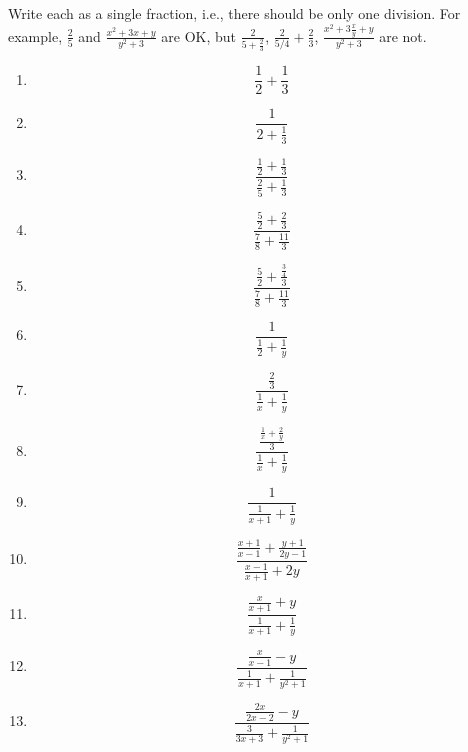 \documentclass[twocolumn,12pt]{report}
\begin{document}
Write each as a single fraction, i.e., there should be only one division.
For example, $\frac{2}{5}$ and $\frac{x^2 + 3x + y}{y^2 + 3}$ are OK, but
$\frac{2}{5 + \frac{2}{3}}$,
$\frac{2}{5/4} + \frac{2}{3}$,
$\frac{x^2 + 3\frac{x}{y} + y}{y^2 + 3}$
are not.


\begin{enumerate}
\item
\[ \frac{1}{2} + \frac{1}{3} \]
\item
\[ \frac{1}{{2} + \frac{1}{3}} \]
\item
\[ \frac{\frac{1}{2} + \frac{1}{3}}{\frac{2}{5} + \frac{1}{3}} \]
\item
\[ \frac{\frac{5}{2} + \frac{2}{3}}{\frac{7}{8} + \frac{11}{3}} \]
\item
\[ \frac{\frac{5}{2} + \frac{\frac{3}{4}}{3}}{\frac{7}{8} + \frac{11}{3}} \]
\item
\[ \frac{1}{\frac{1}{2} + \frac{1}{y}} \]
\item
\[ \frac{\frac{2}{3}}{\frac{1}{x} + \frac{1}{y}} \]
\item
\[ \frac{\frac{\frac{1}{x} + \frac{2}{y}}{3}}{\frac{1}{x} + \frac{1}{y}} \]
\item
\[ \frac{1}{\frac{1}{x+1} + \frac{1}{y}} \]
\item
\[ \frac{\frac{x+1}{x-1} + \frac{y+1}{2y-1}}{\frac{x-1}{x+1} + 2y} \]
\item
\[ \frac{\frac{x}{x+1} + y}{\frac{1}{x+1} + \frac{1}{y}} \]
\item
\[ \frac{\frac{x}{x-1} - y}{\frac{1}{x+1} + \frac{1}{y^2 + 1}} \]
\item
\[ \frac{\frac{2x}{2x-2} - y}{\frac{3}{3x+3} + \frac{1}{y^2 + 1}} \]
\end{enumerate}
\end{document}
